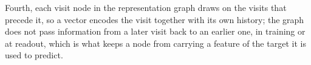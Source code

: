 Fourth, each
visit node in the representation graph draws on the visits that precede it, so a vector encodes the visit
together with its own history; the graph does not pass information from a later visit back to an earlier
one, in training or at readout, which is what keeps a node from carrying a feature of the target it is
used to predict.
